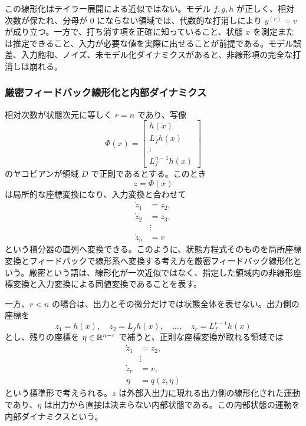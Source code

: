 この線形化はテイラー展開による近似ではない。モデル $f,g,h$ が正しく、相対次数が保たれ、分母が 0 にならない領域では、代数的な打消しにより $y^{(r)}=v$ が成り立つ。一方で、打ち消す項を正確に知っていること、状態 $x$ を測定または推定できること、入力が必要な値を実際に出せることが前提である。モデル誤差、入力飽和、ノイズ、未モデル化ダイナミクスがあると、非線形項の完全な打消しは崩れる。

\subsubsection{厳密フィードバック線形化と内部ダイナミクス}

相対次数が状態次元に等しく $r=n$ であり、写像
\begin{equation}
  \Phi(x)=
  \begin{bmatrix}
    h(x)\\
    L_fh(x)\\
    \vdots\\
    L_f^{n-1}h(x)
  \end{bmatrix}
\end{equation}
のヤコビアンが領域 $D$ で正則であるとする。このとき
\begin{equation}
  z=\Phi(x)
\end{equation}
は局所的な座標変換になり、入力変換と合わせて
\begin{align}
  \dot{z}_1&=z_2,\\
  \dot{z}_2&=z_3,\\
  &\vdots\\
  \dot{z}_n&=v
\end{align}
という積分器の直列へ変換できる。このように、状態方程式そのものを局所座標変換とフィードバックで線形系へ変換する考え方を厳密フィードバック線形化という。厳密という語は、線形化が一次近似ではなく、指定した領域内の非線形座標変換と入力変換による同値変換であることを表す。

一方、$r<n$ の場合は、出力とその微分だけでは状態全体を表せない。出力側の座標を
\begin{equation}
  z_1=h(x),\quad z_2=L_fh(x),\quad\ldots,\quad z_r=L_f^{r-1}h(x)
\end{equation}
とし、残りの座標を $\eta\in\mathbb{R}^{n-r}$ で補うと、正則な座標変換が取れる領域では
\begin{align}
  \dot{z}_1&=z_2,\\
  &\vdots\\
  \dot{z}_r&=v,\\
  \dot{\eta}&=q(z,\eta)
\end{align}
という標準形で考えられる。$z$ は外部入出力に現れる出力側の線形化された運動であり、$\eta$ は出力から直接は決まらない内部状態である。この内部状態の運動を内部ダイナミクスという。

